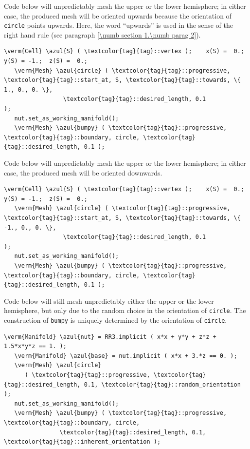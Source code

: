 Code below will unpredictably mesh the upper or the lower hemisphere;
in either case, the produced mesh will be oriented upwards because the orientation
of {\small\tt circle} points upwards.
Here, the word ``upwards'' is used in the sense of the right hand rule
(see paragraph \ref{\numb section 1.\numb parag 2}).

\begin{Verbatim}[commandchars=\\\{\},formatcom=\small\tt,
   baselinestretch=0.94,framesep=2mm                     ]
   \verm{Cell} \azul{S} ( \textcolor{tag}{tag}::vertex );    x(S) =  0.;  y(S) = -1.;  z(S) =  0.;
   \verm{Mesh} \azul{circle} ( \textcolor{tag}{tag}::progressive, \textcolor{tag}{tag}::start_at, S, \textcolor{tag}{tag}::towards, \{ 1., 0., 0. \},
                 \textcolor{tag}{tag}::desired_length, 0.1                                         );
   nut.set_as_working_manifold();
   \verm{Mesh} \azul{bumpy} ( \textcolor{tag}{tag}::progressive, \textcolor{tag}{tag}::boundary, circle, \textcolor{tag}{tag}::desired_length, 0.1 );
\end{Verbatim}

Code below will unpredictably mesh the upper or the lower hemisphere;
in either case, the produced mesh will be oriented downwards.

\begin{Verbatim}[commandchars=\\\{\},formatcom=\small\tt,
   baselinestretch=0.94,framesep=2mm                     ]
   \verm{Cell} \azul{S} ( \textcolor{tag}{tag}::vertex );    x(S) =  0.;  y(S) = -1.;  z(S) =  0.;
   \verm{Mesh} \azul{circle} ( \textcolor{tag}{tag}::progressive, \textcolor{tag}{tag}::start_at, S, \textcolor{tag}{tag}::towards, \{ -1., 0., 0. \},
                 \textcolor{tag}{tag}::desired_length, 0.1                                          );
   nut.set_as_working_manifold();
   \verm{Mesh} \azul{bumpy} ( \textcolor{tag}{tag}::progressive, \textcolor{tag}{tag}::boundary, circle, \textcolor{tag}{tag}::desired_length, 0.1 );
\end{Verbatim}

Code below will still mesh unpredictably either the upper or the lower
hemisphere, but only due to the random choice in the orientation of {\small\tt circle}.
The construction of {\small\tt bumpy} is uniquely determined by the orientation of
{\small\tt circle}.

\begin{Verbatim}[commandchars=\\\{\},formatcom=\small\tt,
   baselinestretch=0.94,framesep=2mm                      ]
   \verm{Manifold} \azul{nut} = RR3.implicit ( x*x + y*y + z*z + 1.5*x*y*z == 1. );
   \verm{Manifold} \azul{base} = nut.implicit ( x*x + 3.*z == 0. );
   \verm{Mesh} \azul{circle}
      ( \textcolor{tag}{tag}::progressive, \textcolor{tag}{tag}::desired_length, 0.1, \textcolor{tag}{tag}::random_orientation );
   nut.set_as_working_manifold();
   \verm{Mesh} \azul{bumpy} ( \textcolor{tag}{tag}::progressive, \textcolor{tag}{tag}::boundary, circle,
                \textcolor{tag}{tag}::desired_length, 0.1, \textcolor{tag}{tag}::inherent_orientation );
\end{Verbatim}


